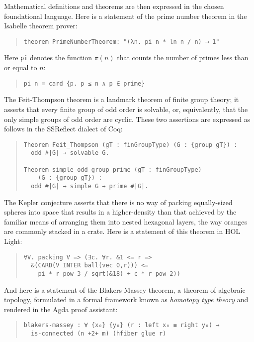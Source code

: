 \documentclass[11pt]{article}
\begin{document}
Mathematical definitions and theorems are then expressed in the chosen foundational language. Here is a statement of the prime number theorem in the Isabelle theorem prover:
\begin{quote}\begin{lstlisting}
theorem PrimeNumberTheorem: "(λn. pi n * ln n / n) ⟶ 1" 
\end{lstlisting}\end{quote}
Here \texttt{pi} denotes the function $\pi(n)$ that counts the number of primes less than or equal to $n$:
\begin{quote}\begin{lstlisting}
pi n ≡ card {p. p ≤ n ∧ p ∈ prime} 
\end{lstlisting}\end{quote}
The Feit-Thompson theorem is a landmark theorem of finite group theory; it asserts that every finite group of odd order is solvable, or, equivalently, that the only simple groups of odd order are cyclic. These two assertions are expressed as follows in the SSReflect dialect of Coq:
\begin{quote}\begin{lstlisting}
Theorem Feit_Thompson (gT : finGroupType) (G : {group gT}) :
  odd #|G| → solvable G.

Theorem simple_odd_group_prime (gT : finGroupType) 
    (G : {group gT}) :
  odd #|G| → simple G → prime #|G|. 
\end{lstlisting}\end{quote}
The Kepler conjecture asserts that there is no way of packing equally-sized spheres into space that results in a higher-density than that achieved by the familiar means of arranging them into nested hexagonal layers, the way oranges are commonly stacked in a crate. Here is a statement of this theorem in HOL Light:
\begin{quote}\begin{lstlisting}
∀V. packing V => (∃c. ∀r. &1 <= r => 
  &(CARD(V INTER ball(vec 0,r))) <=
    pi * r pow 3 / sqrt(&18) + c * r pow 2))
\end{lstlisting}\end{quote}
And here is a statement of the Blakers-Massey theorem, a theorem of algebraic topology, formulated in a formal framework known as \emph{homotopy type theory} and rendered in the Agda proof assistant:
\begin{quote}\begin{lstlisting}
blakers-massey : ∀ {x₀} {y₀} (r : left x₀ ≡ right y₀) → 
  is-connected (n +2+ m) (hfiber glue r)
\end{lstlisting}\end{quote}
\end{document}
